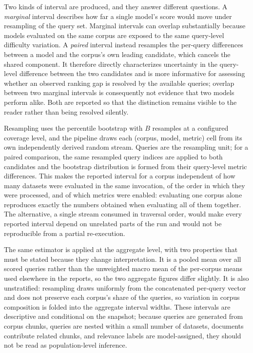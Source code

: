 Two kinds of interval are produced, and they answer different questions. A \emph{marginal} interval describes how far a single model's score would move under resampling of the query set. Marginal intervals can overlap substantially because models evaluated on the same corpus are exposed to the same query-level difficulty variation. A \emph{paired} interval instead resamples the per-query differences between a model and the corpus's own leading candidate, which cancels the shared component. It therefore directly characterizes uncertainty in the query-level difference between the two candidates and is more informative for assessing whether an observed ranking gap is resolved by the available queries; overlap between two marginal intervals is consequently not evidence that two models perform alike. Both are reported so that the distinction remains visible to the reader rather than being resolved silently.

Resampling uses the percentile bootstrap with $B$ resamples at a configured coverage level, and the pipeline draws each (corpus, model, metric) cell from its own independently derived random stream. Queries are the resampling unit; for a paired comparison, the same resampled query indices are applied to both candidates and the bootstrap distribution is formed from their query-level metric differences. This makes the reported interval for a corpus independent of how many datasets were evaluated in the same invocation, of the order in which they were processed, and of which metrics were enabled: evaluating one corpus alone reproduces exactly the numbers obtained when evaluating all of them together. The alternative, a single stream consumed in traversal order, would make every reported interval depend on unrelated parts of the run and would not be reproducible from a partial re-execution.

The same estimator is applied at the aggregate level, with two properties that must be stated because they change interpretation. It is a pooled mean over all scored queries rather than the unweighted macro mean of the per-corpus means used elsewhere in the reports, so the two aggregate figures differ slightly. It is also unstratified: resampling draws uniformly from the concatenated per-query vector and does not preserve each corpus's share of the queries, so variation in corpus composition is folded into the aggregate interval widths. These intervals are descriptive and conditional on the snapshot; because queries are generated from corpus chunks, queries are nested within a small number of datasets, documents contribute related chunks, and relevance labels are model-assigned, they should not be read as population-level inference.

